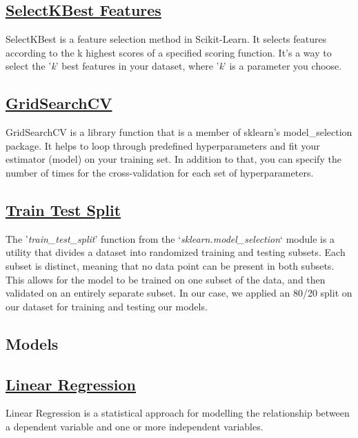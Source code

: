\documentclass[conference]{IEEEtran}
\begin{document}
    \subsection*{\href{https://scikit-learn.org/stable/modules/generated/sklearn.feature_selection.SelectKBest.html}{SelectKBest Features}}
    SelectKBest is a feature selection method in Scikit-Learn. It selects features according to the k highest scores of a specified scoring function. It's a way to select the '\textit{k}' best features in your dataset, where '\textit{k}' is a parameter you choose.
    
    \subsection*{\href{https://scikit-learn.org/stable/modules/generated/sklearn.model_selection.GridSearchCV.html}{GridSearchCV}}
    GridSearchCV is a library function that is a member of sklearn's model\_selection package. It helps to loop through predefined hyperparameters and fit your estimator (model) on your training set. In addition to that, you can specify the number of times for the cross-validation for each set of hyperparameters.
    
    \subsection*{\href{https://scikit-learn.org/stable/modules/generated/sklearn.model_selection.train_test_split.html}{Train Test Split}}
    The '\textit{train\_test\_split}' function from the `\textit{sklearn.model\_selection}` module is a utility that divides a dataset into randomized training and testing subsets. Each subset is distinct, meaning that no data point can be present in both subsets. This allows for the model to be trained on one subset of the data, and then validated on an entirely separate subset. In our case, we applied an 80/20 split on our dataset for training and testing our models.
    
    \subsection*{Models}
    \subsection{\href{https://en.wikipedia.org/wiki/Linear_regression}{Linear Regression}}
    Linear Regression is a statistical approach for modelling the relationship between a dependent variable and one or more independent variables.
\end{document}
